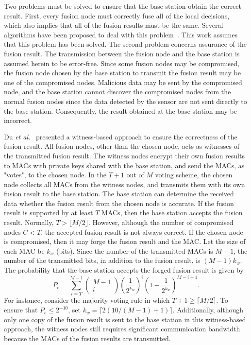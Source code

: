 \documentclass[12pt, onecolumn, draftcls]{IEEEtran}
\begin{document}
Two problems must be solved to ensure that the base station obtain
the correct result. First, every fusion node must correctly fuse all
of the local decisions, which also implies that all of the fusion
results must be the same. Several algorithms have been proposed to
deal with this
problem~\cite{varshney:dd,costa:dc,wang:dc_ft,wang:df_cc}. This work
assumes that this problem has been solved. The second problem
concerns assurance of the fusion result. The transmission between
the fusion node and the base station is assumed herein to be
error-free. Since some fusion nodes may be compromised, the fusion
node chosen by the base station to transmit the fusion result may be
one of the compromised nodes. Malicious data may be sent by the
compromised node, and the base station cannot discover the
compromised nodes from the normal fusion nodes since the data
detected by the sensor are not sent directly to the base station.
Consequently, the result obtained at the base station may be
incorrect.

Du {\it et al.}~\cite{du:assurance} presented a witness-based
approach to ensure the correctness of the fusion result. All fusion
nodes, other than the chosen node, acts as witnesses of the
transmitted fusion result. The witness nodes encrypt their own
fusion results to MACs with private keys shared with the base
station, and send the MACs, as "votes", to the chosen node. In the
$T+1$ out of $M$ voting scheme, the chosen node collects all MACs
from the witness nodes, and transmits them with its own fusion
result to the base station. The base station can determine the
received data whether the fusion result from the chosen node is
accurate. If the fusion result is supported by at least $T$ MACs,
then the base station accepts the fusion result. Normally,  $T >
\lfloor M/2 \rfloor$. However, although the number of compromised
nodes $C<T$, the accepted fusion result is not always correct. If
the chosen node is compromised, then it may forge the fusion result
and the MAC. Let the size of each MAC be $k_w$ (bits). Since the
number of the transmitted MACs is $M-1$, the number of the
transmitted bits, in addition to the fusion result, is $(M-1)k_w$.
The probability that the base station accepts the forged fusion
result is given by
\[
P_e = \sum_{i=T}^{M-1}\left(\begin{array}{c} M-1 \\ i
\end{array}\right)
\left(\frac{1}{2^{k_w}}\right)^i\left(1-\frac{1}{2^{k_w}}\right)^{M-i-1}.
\]
For instance, consider the majority voting rule in which $T+1 \ge
\lceil M/2 \rceil$. To ensure that $P_e \le 2^{-10}$, set
$k_w=\lceil 2\left(10/(M-1)+1\right)\rceil$. Additionally, although
only one copy of the fusion result is sent to the base station in
this witness-based approach, the witness nodes still requires
significant communication bandwidth because the MACs of the fusion
results are transmitted.
\end{document}

